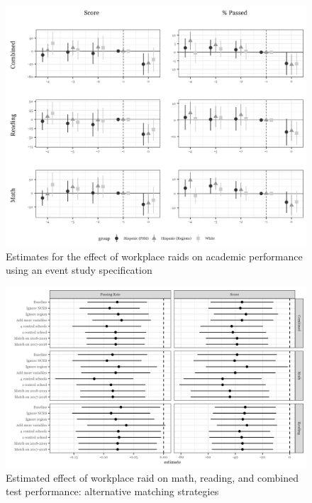 \documentclass[hidelinks,twoside]{article}
\begin{document}
\vspace{1ex}
\begin{figure}[H]
\caption{{Estimates for the effect of workplace raids on academic performance using an event study specification}}
\centerline{\includegraphics[scale=0.8]{event_study.png}}
\label{fig:performanceeventstudy}
\end{figure}


\vspace{1ex}
\begin{figure}[H]
\caption{{Estimated effect of workplace raid on math, reading, and combined test performance: alternative matching strategies}}
\centerline{\includegraphics[scale=0.9]{psm_robustness.png}}
\label{fig:psmalt}
\end{figure}
\end{document}
